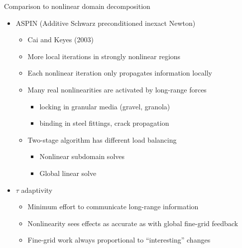 \documentclass{beamer}
\begin{document}
\begin{frame}{Comparison to nonlinear domain decomposition}
  \begin{itemize}
  \item ASPIN (Additive Schwarz preconditioned inexact Newton) \\
    \begin{itemize}
    \item Cai and Keyes (2003)
    \item More local iterations in strongly nonlinear regions
    \item Each nonlinear iteration only propagates information locally
    \item Many real nonlinearities are activated by long-range forces
      \begin{itemize}
      \item locking in granular media (gravel, granola)
      \item binding in steel fittings, crack propagation
      \end{itemize}
    \item Two-stage algorithm has different load balancing
      \begin{itemize}
      \item Nonlinear subdomain solves
      \item Global linear solve
      \end{itemize}
    \end{itemize}
  \item $\tau$ adaptivity
    \begin{itemize}
    \item Minimum effort to communicate long-range information
    \item Nonlinearity sees effects as accurate as with global fine-grid feedback
    \item Fine-grid work always proportional to ``interesting'' changes
    \end{itemize}
  \end{itemize}
\end{frame}


\end{document}
